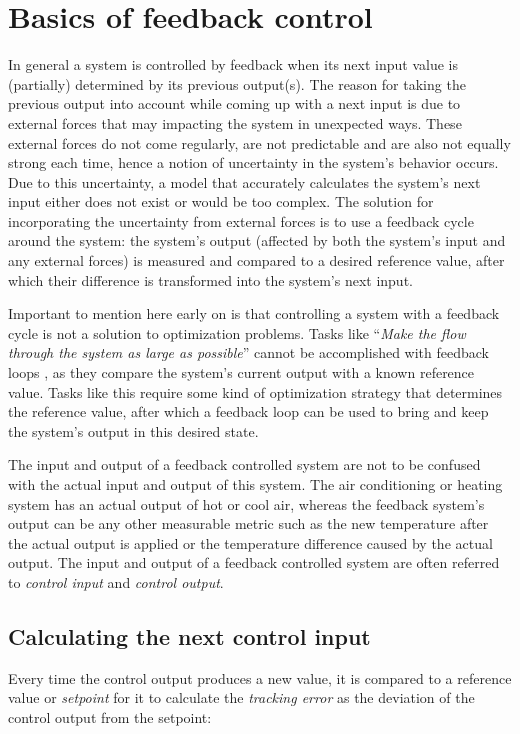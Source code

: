 \section{Basics of feedback control}
In general a system is controlled by feedback when its next input value is (partially) determined by its previous output(s). The reason for taking the previous output into account while coming up with a next input is due to external forces that may impacting the system in unexpected ways. These external forces do not come regularly, are not predictable and are also not equally strong each time, hence a notion of uncertainty in the system's behavior occurs. Due to this uncertainty, a model that accurately calculates the system's next input either does not exist or would be too complex. The solution for incorporating the uncertainty from external forces is to use a feedback cycle around the system: the system's output (affected by both the system's input and any external forces) is measured and compared to a desired reference value, after which their difference is transformed into the system's next input.

Important to mention here early on is that controlling a system with a feedback cycle is not a solution to optimization problems. Tasks like ``\textit{Make the flow through the system as large as possible}'' cannot be accomplished with feedback loops \cite{janert2013-feedback}, as they compare the system's current output with a known reference value. Tasks like this require some kind of optimization strategy that determines the reference value, after which a feedback loop can be used to bring and keep the system's output in this desired state.

The input and output of a feedback controlled system are not to be confused with the actual input and output of this system. The air conditioning or heating system has an actual output of hot or cool air, whereas the feedback system's output can be any other measurable metric such as the new temperature after the actual output is applied or the temperature difference caused by the actual output. The input and output of a feedback controlled system are often referred to \textit{control input} and \textit{control output}.

\subsection{Calculating the next control input}
Every time the control output produces a new value, it is compared to a reference value or \textit{setpoint} for it to calculate the \textit{tracking error} as the deviation of the control output from the setpoint:

